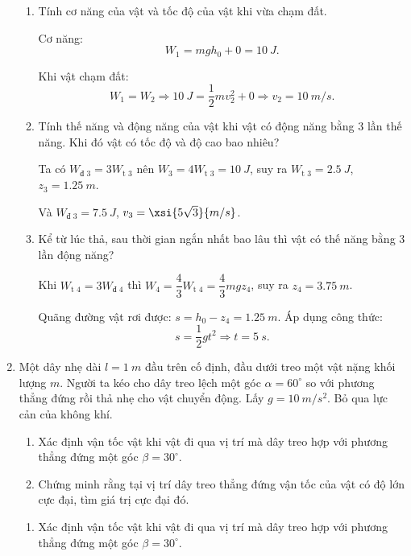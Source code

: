 \begin{enumerate}[label=\bfseries Câu \arabic*:]
	\hideall
	{	
			\begin{enumerate}[label=\alph*)]
			\item Tính cơ năng của vật và tốc độ của vật khi vừa chạm đất.
			
			Cơ năng:
			$$W_1 = mgh_0 + 0 = \SI{10}{J}.$$
			
			Khi vật chạm đất:
			$$W_1 = W_2 \Rightarrow \SI{10}{J} = \dfrac{1}{2} mv_2^2 + 0 \Rightarrow v_2 = \SI{10}{m/s}.$$
			
			\item Tính thế năng và động năng của vật khi vật có động năng bằng 3 lần thế năng. Khi đó vật có tốc độ và độ cao bao nhiêu?
			
			Ta có $W_\text{đ 3} = 3 W_\text{t 3}$ nên $W_3 = 4 W_\text{t 3} = \SI{10}{J}$, suy ra $W_\text{t 3} = \SI{2.5}{J}$, $z_3 = \SI{1.25}{m}$.
			
			Và $W_\text{đ 3} = \SI{7.5}{J}$, $v_3 = \xsi{5\sqrt 3}{m/s}$.
			
			\item Kể từ lúc thả, sau thời gian ngắn nhất bao lâu thì vật có thế năng bằng 3 lần động năng?
			
			Khi $W_\text{t 4} = 3W_\text{đ 4}$ thì $W_4 = \dfrac{4}{3} W_\text{t 4} = \dfrac{4}{3} mgz_4$, suy ra $z_4 = \SI{3.75}{m}$.
			
			Quãng đường vật rơi được: $s=h_0-z_4 = \SI{1.25}{m}$. Áp dụng công thức:
			$$s=\dfrac{1}{2}gt^2 \Rightarrow t = \SI{5}{s}.$$
		\end{enumerate}
	}
	\item {}
	
	
	{
		Một dây nhẹ dài $l=\SI{1}{m}$ đầu trên cố định, đầu dưới treo một vật nặng khối lượng $m$. Người ta kéo cho dây treo lệch một góc $\alpha = 60^\circ$ so với phương thẳng đứng rồi thả nhẹ cho vật chuyển động. Lấy $g=\SI{10}{m/s^2}$. Bỏ qua lực cản của không khí.
		\begin{enumerate}[label=\alph*)]
			\item Xác định vận tốc vật khi vật đi qua vị trí mà dây treo hợp với phương thẳng đứng một góc $\beta = 30^\circ$.
			\item Chứng minh rằng tại vị trí dây treo thẳng đứng vận tốc của vật có độ lớn cực đại, tìm giá trị cực đại đó.
		\end{enumerate}
	}
	
	\hideall
	{	
			\begin{enumerate}[label=\alph*)]
			\item Xác định vận tốc vật khi vật đi qua vị trí mà dây treo hợp với phương thẳng đứng một góc $\beta = 30^\circ$.
			

\end{enumerate}}
\end{enumerate}
